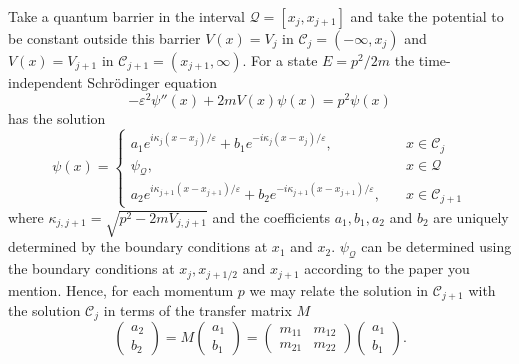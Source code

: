 \documentclass[12pt]{article}       %
\begin{document}
Take a quantum barrier in the interval $\mathcal{Q} = [x_j, x_{j+1}]$ and take the potential to be constant outside this barrier $V(x) = V_j$ in $\mathcal{C}_j = (-\infty, x_j)$ and $V(x) = V_{j+1}$ in $\mathcal{C}_{j+1} =(x_{j+1}, \infty)$. For a state $E=p^2/2m$ the time-independent Schr\"odinger equation
\begin{equation}\label{eq: main}
    -\varepsilon^2\psi''(x) + 2mV(x)\psi(x) = p^2\psi(x)
\end{equation}
has the solution
\begin{equation}\label{eq: solution}
    \psi(x) = 
    \begin{cases}
        a_1 e^{i\kappa_j(x-x_j)/\varepsilon} + b_1 e^{-i\kappa_j(x-x_j)/\varepsilon},&\quad x\in \mathcal{C}_j \\
        \psi_{\mathcal{Q}}, &\quad x\in\mathcal{Q} \\
        a_2 e^{i\kappa_{j+1}(x-x_{j+1})/\varepsilon} + b_2 e^{-i\kappa_{j+1}(x-x_{j+1})/\varepsilon},&\quad x\in \mathcal{C}_{j+1}
    \end{cases}
\end{equation}
where $\kappa_{j,j+1} = \sqrt{p^2-2mV_{j, j+1}}$ and the coefficients $a_1, b_1, a_2$ and $b_2$ are uniquely determined by the boundary conditions at $x_1$ and $x_2$. $\psi_\mathcal{Q}$ can be determined using the boundary conditions at $x_j, x_{j+1/2}$ and $x_{j+1}$ according to the paper you mention. Hence, for each momentum $p$ we may relate the solution in $\mathcal{C}_{j+1}$ with the solution $\mathcal{C}_j$ in terms of the transfer matrix $M$
\begin{equation}\label{eq: transfer matrix}
    \left(\begin{matrix}
        a_2 \\
        b_2
    \end{matrix}\right)
    = M
    \left(\begin{matrix}
        a_1 \\
        b_1
    \end{matrix}\right)
    = \left(
    \begin{matrix}
        m_{11} & m_{12} \\
        m_{21} & m_{22}
    \end{matrix}\right)
    \left(\begin{matrix}
        a_1 \\
        b_1
    \end{matrix}\right).
\end{equation}
\end{document}
